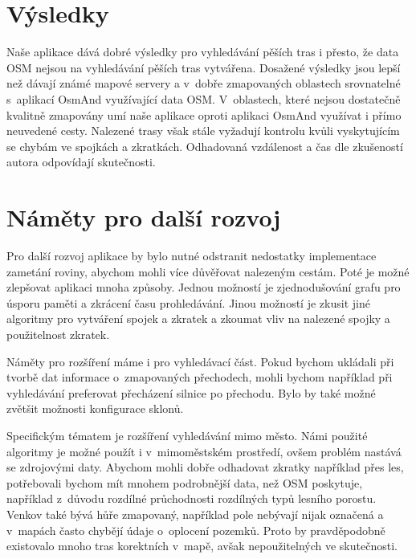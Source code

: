 \section*{Výsledky}
Naše aplikace dává dobré výsledky pro vyhledávání pěších tras i přesto, že data
OSM nejsou na vyhledávání pěších tras vytvářena. Dosažené výsledky jsou lepší
než dávají známé mapové servery a v~dobře zmapovaných oblastech srovnatelné
s~aplikací OsmAnd využívající data OSM. V~oblastech, které nejsou dostatečně
kvalitně zmapovány umí naše aplikace oproti aplikaci OsmAnd využívat i přímo
neuvedené cesty.  Nalezené trasy však stále vyžadují kontrolu kvůli vyskytujícím
se chybám ve spojkách a zkratkách.  Odhadovaná vzdálenost a čas dle zkušeností
autora odpovídají skutečnosti. 


\section*{Náměty pro další rozvoj}
Pro další rozvoj aplikace by bylo nutné odstranit nedostatky implementace
zametání roviny, abychom mohli více důvěřovat nalezeným cestám. Poté je možné
zlepšovat aplikaci mnoha způsoby. Jednou možností je zjednodušování grafu pro
úsporu paměti a zkrácení času prohledávání. Jinou možností je zkusit jiné
algoritmy pro vytváření spojek a zkratek a zkoumat vliv na nalezené spojky a
použitelnost zkratek.

Náměty pro rozšíření máme i pro vyhledávací část. Pokud bychom ukládali při
tvorbě dat informace o~zmapovaných přechodech, mohli bychom například při
vyhledávání preferovat přecházení silnice po přechodu. Bylo by také možné
zvětšit možnosti konfigurace sklonů. 

Specifickým tématem je rozšíření vyhledávání mimo město. Námi použité algoritmy
je možné použít i v~mimoměstském prostředí, ovšem problém nastává se zdrojovými
daty. Abychom mohli dobře odhadovat zkratky například přes les, potřebovali
bychom mít mnohem podrobnější data, než OSM poskytuje, například z~důvodu
rozdílné průchodnosti rozdílných typů lesního porostu. Venkov také bývá hůře
zmapovaný, například pole nebývají nijak označená a v~mapách často chybějí údaje
o~oplocení pozemků. Proto by pravděpodobně existovalo mnoho tras korektních
v~mapě, avšak nepoužitelných ve skutečnosti.
